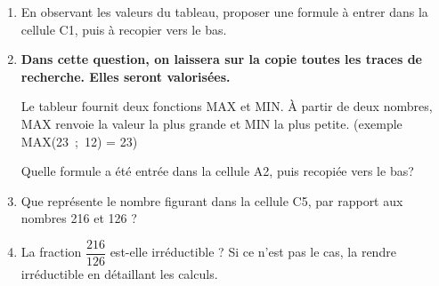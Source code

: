 \documentclass[10pt]{article}
\begin{document}
\begin{enumerate}
\item En observant les valeurs du tableau, proposer une formule à entrer dans la 
cellule C1, puis à recopier vers le bas. 
\item \textbf{Dans cette question, on laissera sur la copie toutes les traces de 
recherche. Elles seront valorisées.}

\medskip
 
Le tableur fournit deux fonctions MAX et MIN. À partir de deux nombres, MAX renvoie la valeur la plus grande et MIN la plus petite. (exemple MAX(23~;~12) = 23)

Quelle formule a été entrée dans la cellule A2, puis recopiée vers le bas? 
\item Que représente le nombre figurant dans la cellule C5, par rapport aux 
nombres 216 et 126 ? 
\item La fraction $\dfrac{216}{126}$ est-elle irréductible ? Si ce n'est pas le cas, la rendre  irréductible en détaillant les calculs.
\end{enumerate}
 
\vspace{0,5cm}
\end{document}
